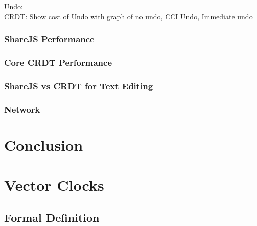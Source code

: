 \documentclass[12pt,a4paper,twoside,openright]{report}
\begin{document}
			Undo:\\
				CRDT: Show cost of Undo with graph of no undo, CCI Undo, Immediate undo
				
							
							
			
			
			
	
		\subsection{ShareJS Performance}
		
			\subsubsection{}
		
		\subsection{Core CRDT Performance}
		
		\subsection{ShareJS vs CRDT for Text Editing}
		
		\subsection{Network}
		
		
		
		
		
		


\chapter{Conclusion}



\printbibliography

\appendix

\chapter{Vector Clocks}

\section{Formal Definition}
\label{appendix:vectorclocks}
\end{document}
